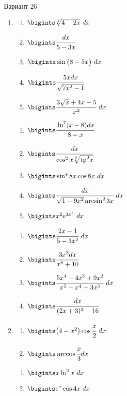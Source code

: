 \documentclass{article}
\begin{document}
\begin{multicols}{2}
	\centerline{Вариант 26}
	\begin{enumerate}[label=\Roman*.]
		\item
		\begin{multicols}{3}
			\begin{enumerate}[label=\arabic*.]
				\setlength\itemsep{1em}
				\item $\bigints\sqrt[7]{4-2x}\ dx$
				\item $\bigints\cfrac{dx}{5-3x}$
				\item $\bigints\sin \big( 8-5x \big)\ dx$
				\item $\bigints\cfrac{5xdx}{\sqrt{7x^2-1}}$
				\item $\bigints\cfrac{3\sqrt{x}+4x-5}{x^2}\ dx$
			\end{enumerate}
			\vfill\null\columnbreak
			\begin{enumerate}[label=\arabic*. , start=6]
				\setlength\itemsep{1em}
				\item $\bigints\cfrac{\ln^7(x-8)dx}{8-x}$
				\item $\bigints\cfrac{dx}{\cos^2x \sqrt[5]{\mbox{tg}^2x}}$
				\item $\bigints \sin^4 8x \cos 8x\ dx$
				\item $\bigints\cfrac{dx}{\sqrt{1-9x^2}\arcsin^2 3x}\ dx$
				\item $\bigints x^2\mbox{e}^{3x^3}\ dx$
			\end{enumerate}
			\vfill\null\columnbreak
			\begin{enumerate}[label=\arabic*. , start=11]
				\setlength\itemsep{1em}
				\item $\bigints\cfrac{2x - 1}{5-3x^2}\ dx$
				\item $\bigints\cfrac{3x^3dx}{x^8+10}$
				\item $\bigints\cfrac{5x^4-4x^3+9x^2}{x^5-x^4+3x^3}\ dx$
				\vspace{6mm}
				\item $\bigints\cfrac{dx}{(2x+3)^2-16}$
			\end{enumerate}
			\vfill\null\columnbreak
		\end{multicols}
		
		\item
		\begin{multicols}{3}
			\begin{enumerate}[label=\arabic*.]
				\setlength\itemsep{1em}
				\item $\bigints\big(4-x^2\big)\cos\cfrac{x}{2}\ dx$
				\item $\bigints\arccos \cfrac{x}{3} dx$
			\end{enumerate}
			\vfill\null\columnbreak
			\begin{enumerate}[label=\arabic*., start=3]
				\setlength\itemsep{1em}
				\item $\bigints x\ln^2x\ dx$
				\item $\bigints\mbox{e}^{x}\cos 4x\ dx$
			\end{enumerate}
			\vfill\null\columnbreak
			\vfill\null\columnbreak
		\end{multicols}
		

\end{enumerate}
\end{multicols}
\end{document}
